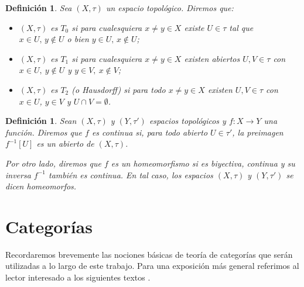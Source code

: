\documentclass[12pt]{book}
\newtheorem{definition}[theorem]{Definición}
\begin{document}
\begin{definition}\label{def:espacios-T}
Sea \( (X,\tau) \) un espacio topológico.  
Diremos que:
\begin{itemize}
  \item \( (X,\tau) \) es \emph{\(T_0\)} si para cualesquiera \( x\ne y\in X \)
        existe \( U\in\tau \) tal que \( x\in U,\, y\notin U \)
        o bien \( y\in U,\, x\notin U \);
  \item \( (X,\tau) \) es \emph{\(T_1\)} si para cualesquiera \( x\ne y\in X \)
        existen abiertos \( U,V\in\tau \) con \( x\in U,\ y\notin U \)
        y \( y\in V,\ x\notin V \);
  \item \( (X,\tau) \) es \emph{\(T_2\)} (o \emph{Hausdorff})
        si para todo \( x\ne y\in X \) existen \( U,V\in\tau \)
        con \( x\in U \), \( y\in V \) y \( U\cap V=\emptyset \).
\end{itemize}
\end{definition}

\begin{definition}\label{def:continuidad-homeomorfismo}
Sean $(X,\tau)$ y $(Y,\tau')$ espacios topológicos y 
$f\colon X\to Y$ una función. Diremos que $f$ es \emph{continua} si, para todo abierto 
$U\in\tau'$, la preimagen $f^{-1}[U]$ es un abierto de $(X,\tau)$.

Por otro lado, diremos que $f$ es un \emph{homeomorfismo} si es 
biyectiva, continua y su inversa $f^{-1}$ también es continua.  
En tal caso, los espacios $(X,\tau)$ y $(Y,\tau')$ se dicen 
\emph{homeomorfos}.
\end{definition}



\section{Categorías}

Recordaremos brevemente las nociones básicas de teoría de categorías que serán utilizadas a lo largo de este trabajo.  
Para una exposición más general referimos al lector interesado a los siguientes textos \cite{Adamek}.
\end{document}
